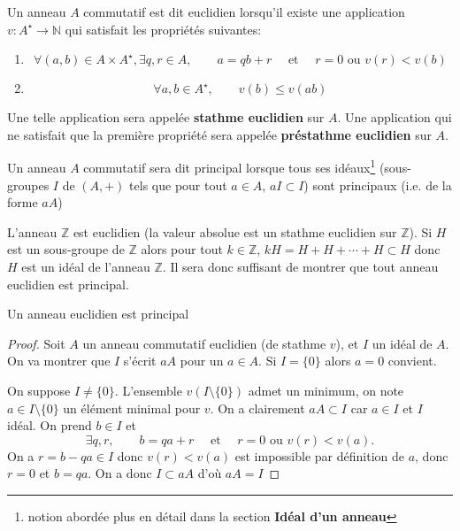 \begin{dfn}
    Un anneau $A$ commutatif est dit euclidien lorsqu'il existe une application $v:A^\star \to \mathbb N$ qui satisfait les propriétés suivantes:
    \begin{enumerate}
        \item \[
                \forall (a, b)\in A\times A^\star, \exists q, r\in A, \qquad a=qb+r\quad \text{ et } \quad r=0\text{ ou } v(r)<v(b)
            \]
        \item \[
                \forall a, b\in A^\star, \qquad v(b)\leq v(ab)
            \]
    \end{enumerate}
    Une telle application sera appelée \textbf{stathme euclidien} sur $A$. Une application qui ne satisfait que la première propriété sera appelée \textbf{préstathme euclidien} sur $A$.

    Un anneau $A$ commutatif sera dit principal lorsque tous ses idéaux\footnote{notion abordée plus en détail dans la section \textbf{Idéal d'un anneau}} (sous-groupes $I$ de $(A, +)$ tels que pour tout $a\in A$, $aI\subset I$) sont principaux (i.e. de la forme $aA$)
\end{dfn}

L'anneau $\mathbb Z$ est euclidien (la valeur absolue est un stathme euclidien sur $\mathbb Z$). Si $H$ est un sous-groupe de $\mathbb Z$ alors pour tout $k\in\mathbb Z$, $kH=H+H+\cdots +H\subset H$ donc $H$ est un idéal de l'anneau $\mathbb Z$. Il sera donc suffisant de montrer que tout anneau euclidien est principal.

\begin{prop}
    Un anneau euclidien est principal
\end{prop}

\begin{proof}
    Soit $A$ un anneau commutatif euclidien (de stathme $v$), et $I$ un idéal de $A$. On va montrer que $I$ s'écrit $aA$ pour un $a\in A$. Si $I=\{0\}$ alors $a=0$ convient.

    On suppose $I\neq \{0\}$. L'ensemble $v(I\setminus\{0\})$ admet un minimum, on note $a\in I\setminus\{0\}$ un élément minimal pour $v$. On a clairement $aA\subset I$ car $a\in I$ et $I$ idéal. On prend $b\in I$ et \[
        \exists q, r, \qquad b=qa+r\quad \text{ et }\quad r=0\text{ ou }v(r)<v(a).
    \]
    On a $r=b-qa\in I$ donc $v(r)<v(a)$ est impossible par définition de $a$, donc $r=0$ et $b=qa$. On a donc $I\subset aA$ d'où $aA=I$
\end{proof}

